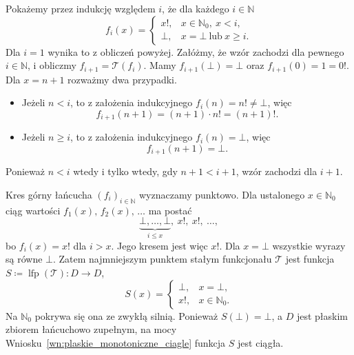 \documentclass[11pt,a4paper]{article}
\theoremstyle{definition}
\theoremstyle{plain}
\newcommand{\bt}{\bot}                            %
\newcommand{\lfp}{\operatorname{lfp}}
\begin{document}
Pokażemy przez indukcję względem $i$, że dla każdego $i\in\mathbb N$
\[
f_i(x)=
\begin{cases}
	x!, & x\in\mathbb N_0,\ x<i,\\
	\bt, & x=\bt\ \text{lub}\ x\geq i.
\end{cases}
\]
Dla $i=1$ wynika to z obliczeń powyżej. Załóżmy, że wzór zachodzi dla
pewnego $i\in\mathbb N$, i obliczmy $f_{i+1}=\mathcal T(f_i)$. Mamy
$f_{i+1}(\bt)=\bt$ oraz $f_{i+1}(0)=1=0!$. Dla $x=n+1$ rozważmy dwa
przypadki.
\begin{itemize}
	\item Jeżeli $n<i$, to z założenia indukcyjnego $f_i(n)=n!\neq\bt$,
	więc
	\[
	f_{i+1}(n+1)=(n+1)\cdot n!=(n+1)!.
	\]
	\item Jeżeli $n\geq i$, to z założenia indukcyjnego $f_i(n)=\bt$, więc
	\[
	f_{i+1}(n+1)=\bt.
	\]
\end{itemize}
Ponieważ $n<i$ wtedy i tylko wtedy, gdy $n+1<i+1$, wzór zachodzi dla
$i+1$.

Kres górny łańcucha $(f_i)_{i\in\mathbb N}$ wyznaczamy punktowo.
Dla ustalonego $x\in\mathbb N_0$ ciąg wartości $f_1(x),\,f_2(x),\,\ldots$
ma postać
\[
\underbrace{\bt,\ldots,\bt}_{i\leq x},\ x!,\ x!,\ \ldots,
\]
bo $f_i(x)=x!$ dla $i>x$. Jego kresem jest więc $x!$. Dla $x=\bt$
wszystkie wyrazy są równe $\bt$. Zatem najmniejszym punktem stałym
funkcjonału $\mathcal{T}$ jest funkcja $S\coloneqq\lfp(\mathcal T):D\to D$,
\[
S(x)
=
\begin{cases}
	\bt,&x=\bt,\\
	x!,&x\in\mathbb{N}_0.
\end{cases}
\]
Na $\mathbb N_0$ pokrywa się ona ze zwykłą silnią. Ponieważ $S(\bt)=\bt$,
a $D$ jest płaskim zbiorem łańcuchowo zupełnym, na mocy
Wniosku~\ref{wn:plaskie_monotoniczne_ciagle} funkcja $S$ jest ciągła.
\end{document}
